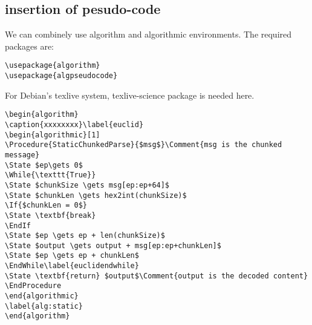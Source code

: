 \subsection{insertion of pesudo-code}

We can combinely use 
algorithm and algorithmic environments.
The required packages are:

\begin{verbatim}
\usepackage{algorithm}
\usepackage{algpseudocode}
\end{verbatim}

For Debian's texlive system, texlive-science package is needed here.
\begin{verbatim}
\begin{algorithm}
\caption{xxxxxxxx}\label{euclid}
\begin{algorithmic}[1]
\Procedure{StaticChunkedParse}{$msg$}\Comment{msg is the chunked message}
\State $ep\gets 0$
\While{\texttt{True}}
\State $chunkSize \gets msg[ep:ep+64]$
\State $chunkLen \gets hex2int(chunkSize)$
\If{$chunkLen = 0$}
\State \textbf{break}
\EndIf
\State $ep \gets ep + len(chunkSize)$
\State $output \gets output + msg[ep:ep+chunkLen]$
\State $ep \gets ep + chunkLen$
\EndWhile\label{euclidendwhile}
\State \textbf{return} $output$\Comment{output is the decoded content}
\EndProcedure
\end{algorithmic}
\label{alg:static}
\end{algorithm}
\end{verbatim}



















